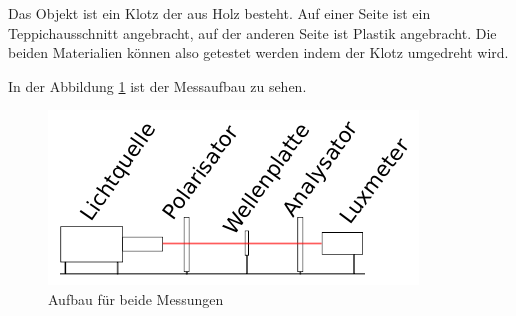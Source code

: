 Das  Objekt  ist  ein  Klotz  der  aus  Holz  besteht. Auf einer Seite  ist  ein
Teppichausschnitt angebracht, auf  der anderen Seite ist Plastik angebracht. Die
beiden Materialien k\"onnen also getestet werden indem der Klotz umgedreht wird.

In der Abbildung \ref{fig:messaufbau} ist der Messaufbau zu sehen.

\begin{figure}[H]
    \centering
    \includegraphics[width=.6\linewidth]{images/messaufbau}
    \caption{Aufbau f\"ur beide Messungen}
    \label{fig:messaufbau}
\end{figure}

